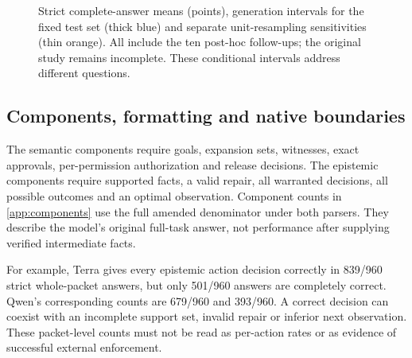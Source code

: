 \documentclass[a4paper,preprint,12pt,numbers,nopreprintline]{elsarticle}
\begin{document}
\begin{figure}[htbp]
\caption{Strict complete-answer means (points), generation intervals for the fixed test set (thick blue) and separate unit-resampling sensitivities (thin orange). All include the ten post-hoc follow-ups; the original study remains incomplete. These conditional intervals address different questions.}\label{fig:ten-pass-intervals}
\end{figure}

\subsection{Components, formatting and native boundaries}
The semantic components require goals, expansion sets, witnesses, exact approvals, per-permission authorization and release decisions. The epistemic components require supported facts, a valid repair, all warranted decisions, all possible outcomes and an optimal observation. Component counts in \ref{app:components} use the full amended denominator under both parsers. They describe the model's original full-task answer, not performance after supplying verified intermediate facts.

For example, Terra gives every epistemic action decision correctly in 839/960 strict whole-packet answers, but only 501/960 answers are completely correct. Qwen's corresponding counts are 679/960 and 393/960. A correct decision can coexist with an incomplete support set, invalid repair or inferior next observation. These packet-level counts must not be read as per-action rates or as evidence of successful external enforcement.
\end{document}
